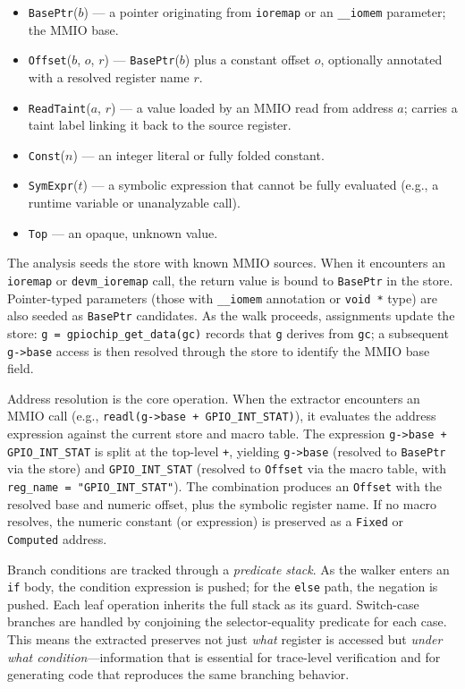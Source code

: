\begin{itemize}
\item \texttt{BasePtr}($b$) --- a pointer originating from \texttt{ioremap} or an \texttt{\_\_iomem} parameter; the MMIO base.
\item \texttt{Offset}($b$, $o$, $r$) --- \texttt{BasePtr}($b$) plus a constant offset $o$, optionally annotated with a resolved register name $r$.
\item \texttt{ReadTaint}($a$, $r$) --- a value loaded by an MMIO read from address $a$; carries a taint label linking it back to the source register.
\item \texttt{Const}($n$) --- an integer literal or fully folded constant.
\item \texttt{SymExpr}($t$) --- a symbolic expression that cannot be fully evaluated (e.g., a runtime variable or unanalyzable call).
\item \texttt{Top} --- an opaque, unknown value.
\end{itemize}

The analysis seeds the store with known MMIO sources. When it encounters an \texttt{ioremap} or \texttt{devm\_ioremap} call, the return value is bound to \texttt{BasePtr} in the store. Pointer-typed parameters (those with \texttt{\_\_iomem} annotation or \texttt{void~*} type) are also seeded as \texttt{BasePtr} candidates. As the walk proceeds, assignments update the store: \texttt{g = gpiochip\_get\_data(gc)} records that \texttt{g} derives from \texttt{gc}; a subsequent \texttt{g->base} access is then resolved through the store to identify the MMIO base field.

Address resolution is the core operation. When the extractor encounters an MMIO call (e.g., \texttt{readl(g->base + GPIO\_INT\_STAT)}), it evaluates the address expression against the current store and macro table. The expression \texttt{g->base + GPIO\_INT\_STAT} is split at the top-level \texttt{+}, yielding \texttt{g->base} (resolved to \texttt{BasePtr} via the store) and \texttt{GPIO\_INT\_STAT} (resolved to \texttt{Offset} via the macro table, with \texttt{reg\_name = "GPIO\_INT\_STAT"}). The combination produces an \texttt{Offset} with the resolved base and numeric offset, plus the symbolic register name. If no macro resolves, the numeric constant (or expression) is preserved as a \texttt{Fixed} or \texttt{Computed} address.

Branch conditions are tracked through a \emph{predicate stack}. As the walker enters an \texttt{if} body, the condition expression is pushed; for the \texttt{else} path, the negation is pushed. Each leaf operation inherits the full stack as its guard. Switch-case branches are handled by conjoining the selector-equality predicate for each case. This means the extracted \rislang{} preserves not just \emph{what} register is accessed but \emph{under what condition}---information that is essential for trace-level verification and for generating code that reproduces the same branching behavior.

